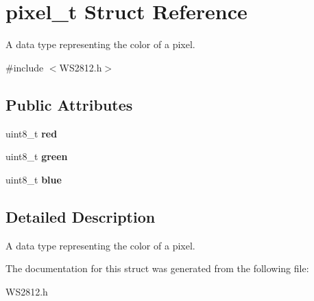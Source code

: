 \hypertarget{structpixel__t}{}\section{pixel\+\_\+t Struct Reference}
\label{structpixel__t}


A data type representing the color of a pixel.  




{\ttfamily \#include $<$W\+S2812.\+h$>$}

\subsection*{Public Attributes}
\begin{DoxyCompactItemize}
\item 
uint8\+\_\+t {\bfseries red}\hypertarget{structpixel__t_a912496dc782ecc3cea2f89eb79b7c9a0}{}\label{structpixel__t_a912496dc782ecc3cea2f89eb79b7c9a0}

\item 
uint8\+\_\+t {\bfseries green}\hypertarget{structpixel__t_a945c55299b107661d118e849b388039b}{}\label{structpixel__t_a945c55299b107661d118e849b388039b}

\item 
uint8\+\_\+t {\bfseries blue}\hypertarget{structpixel__t_a32f72c7c5c7c932c7e554d05f7390941}{}\label{structpixel__t_a32f72c7c5c7c932c7e554d05f7390941}

\end{DoxyCompactItemize}


\subsection{Detailed Description}
A data type representing the color of a pixel. 

The documentation for this struct was generated from the following file\+:\begin{DoxyCompactItemize}
\item 
W\+S2812.\+h\end{DoxyCompactItemize}
